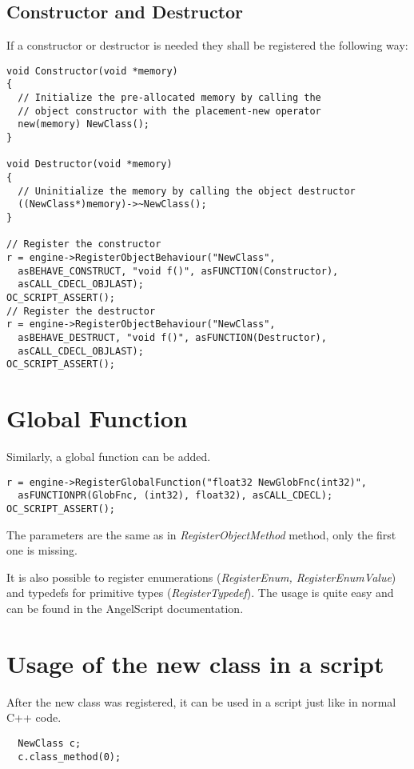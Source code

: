 \documentclass[a4paper, 12pt]{report}
\begin{document}
\subsection{Constructor and Destructor}

If a constructor or destructor is needed they shall be registered the following way:

\footnotesize 
\begin{verbatim}
void Constructor(void *memory)
{
  // Initialize the pre-allocated memory by calling the
  // object constructor with the placement-new operator
  new(memory) NewClass();
}

void Destructor(void *memory)
{
  // Uninitialize the memory by calling the object destructor
  ((NewClass*)memory)->~NewClass();
}

// Register the constructor
r = engine->RegisterObjectBehaviour("NewClass",
  asBEHAVE_CONSTRUCT, "void f()", asFUNCTION(Constructor),
  asCALL_CDECL_OBJLAST);
OC_SCRIPT_ASSERT();
// Register the destructor
r = engine->RegisterObjectBehaviour("NewClass",
  asBEHAVE_DESTRUCT, "void f()", asFUNCTION(Destructor),
  asCALL_CDECL_OBJLAST);
OC_SCRIPT_ASSERT();

\end{verbatim}
\normalsize

\section{Global Function}
Similarly, a global function can be added.

\footnotesize 
\begin{verbatim}
r = engine->RegisterGlobalFunction("float32 NewGlobFnc(int32)", 
  asFUNCTIONPR(GlobFnc, (int32), float32), asCALL_CDECL);
OC_SCRIPT_ASSERT();
\end{verbatim}
\normalsize

The parameters are the same as in \emph{RegisterObjectMethod} method, only the first one is missing.

 It is also possible to register enumerations (\emph{RegisterEnum, RegisterEnumValue}) and typedefs for primitive types (\emph{RegisterTypedef}). The usage is quite easy and can be found in the AngelScript documentation\cite{angelscript}.

\section{Usage of the new class in a script}
After the new class was registered, it can be used in a script just like in normal C++ code.
\footnotesize 
\begin{verbatim}
  NewClass c;
  c.class_method(0);
\end{verbatim}
\normalsize
\end{document}
